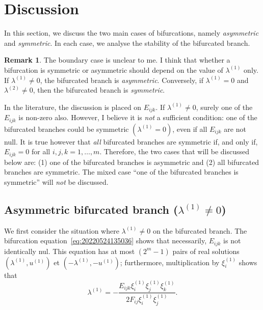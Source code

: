 \documentclass[12pt, final]{scrartcl}
\theoremstyle{definition}
\newtheorem{remark}{Remark}
\newcommand{\order}[2][1]{#2^{(#1)}}
\begin{document}
\section{Discussion}

In this section, we discuss the two main cases of bifurcations, namely
\emph{asymmetric} and \emph{symmetric}. In each case, we analyse the stability
of the bifurcated branch.

\begin{remark}
  The boundary case is unclear to me. I think that whether a bifurcation is
  symmetric or asymmetric should depend on the value of \(\order[1]λ\) only. If
  \(\order[1]λ ≠ 0\), the bifurcated branch is \emph{asymmetric}. Conversely, if
  \(\order[1]λ = 0\) and \(\order[2]λ ≠ 0\), then the bifurcated branch is \emph{symmetric}.

  In the literature, the discussion is placed on \(E_{ijk}\). If \(\order[1]λ ≠ 0\),
  surely one of the \(E_{ijk}\) is non-zero also. However, I believe it is
  \emph{not} a sufficient condition: one of the bifurcated branches could be
  symmetric \((\order[1]λ = 0)\), even if all \(E_{ijk}\) are not null. It is true
  however that \emph{all} bifurcated branches are symmetric if, and only if,
  \(E_{ijk}=0\) for all \(i, j, k = 1, \ldots, m\). Therefore, the two cases
  that will be discussed below are: (1) one of the bifurcated branches is
  asymmetric and (2) all bifurcated branches are symmetric. The mixed case ``one
  of the bifurcated branches is symmetric'' will \emph{not} be discussed.
\end{remark}

\subsection{Asymmetric bifurcated branch (\(\order[1]λ ≠ 0\))}

We first consider the situation where \(\order[1]λ ≠ 0\) on the bifurcated
branch. The bifurcation equation~\eqref{eq:20220524135036} shows that
necessarily, \(E_{ijk}\) is not identically nul. This equation has at most
\((2^m - 1)\) pairs of real solutions \((\order[1]λ, \order[1]u)\) et
\((- \order[1]λ, - \order[1]u)\); furthermore, multiplication by
\(\order[1]{ξ_i}\) shows that
\begin{equation}
  \label{eq:20220801085236}
  \order[1]λ = -\frac{E_{ijk} \order[1]{ξ_i} \order[1]{ξ_j} \order[1]{ξ_k}}{2 F_{ij} \order[1]{ξ_i} \order[1]{ξ_j}}.
\end{equation}
\end{document}
